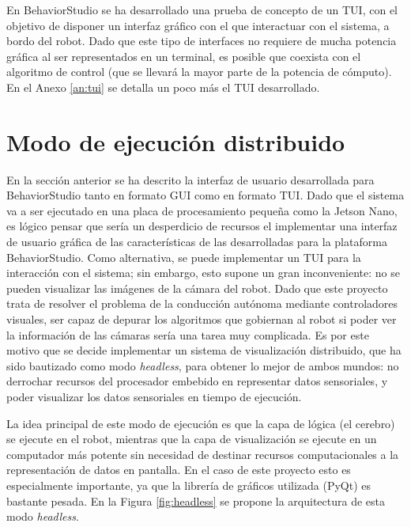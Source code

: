 En BehaviorStudio se ha desarrollado una prueba de concepto de un TUI, con el objetivo de disponer un interfaz gráfico con el que interactuar con el sistema, a bordo del robot. Dado que este tipo de interfaces no requiere de mucha potencia gráfica al ser representados en un terminal, es posible que coexista con el algoritmo de control (que se llevará la mayor parte de la potencia de cómputo). En el Anexo \ref{an:tui} se detalla un poco más el TUI desarrollado.

\section{Modo de ejecución distribuido}
\label{sec:headless}

En la sección anterior se ha descrito la interfaz de usuario desarrollada para BehaviorStudio tanto en formato GUI como en formato TUI. Dado que el sistema va a ser ejecutado en una placa de procesamiento pequeña como la Jetson Nano, es lógico pensar que sería un desperdicio de recursos el implementar una interfaz de usuario gráfica de las características de las desarrolladas para la plataforma BehaviorStudio. Como alternativa, se puede implementar un TUI para la interacción con el sistema; sin embargo, esto supone un gran inconveniente: no se pueden visualizar las imágenes de la cámara del robot. Dado que este proyecto trata de resolver el problema de la conducción autónoma mediante controladores visuales, ser capaz de depurar los algoritmos que gobiernan al robot si poder ver la información de las cámaras sería una tarea muy complicada. Es por este motivo que se decide implementar un sistema de visualización distribuido, que ha sido bautizado como modo \textit{headless}, para obtener lo mejor de ambos mundos: no derrochar recursos del procesador embebido en representar datos sensoriales, y poder visualizar los datos sensoriales en tiempo de ejecución.

La idea principal de este modo de ejecución es que la capa de lógica (el cerebro) se ejecute en el robot, mientras que la capa de visualización se ejecute en un computador más potente sin necesidad de destinar recursos computacionales a la representación de datos en pantalla. En el caso de este proyecto esto es especialmente importante, ya que la librería de gráficos utilizada (PyQt) es bastante pesada. En la Figura \ref{fig:headless} se propone la arquitectura de esta modo \textit{headless}.


